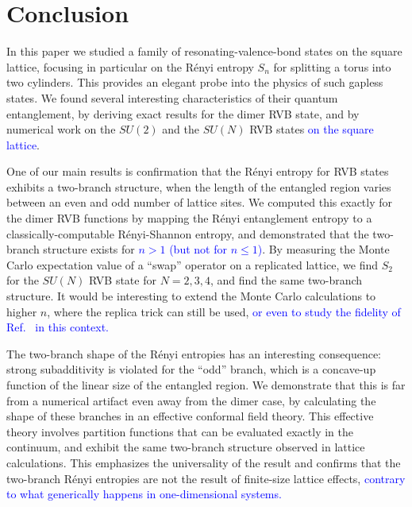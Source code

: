 \documentclass[11pt]{iopart}
\begin{document}
\section{Conclusion} 
\label{sec:conclusion}


In this paper we studied a family of resonating-valence-bond states on the square lattice, focusing in particular on the Rényi entropy $S_n$ for splitting a torus into two cylinders. This provides an elegant probe into the physics of such gapless states. We found several interesting characteristics of their quantum entanglement, by deriving exact results for the dimer RVB state, and by numerical work on the $SU(2)$ and the $SU(N)$ RVB states \textcolor{blue}{on the square lattice}. 

One of our main results is confirmation that the Rényi entropy for RVB states exhibits a two-branch structure, when the length of the entangled region varies between an even and odd number of lattice sites. We computed this exactly for the dimer RVB functions by mapping the R\'enyi entanglement entropy to a classically-computable R\'enyi-Shannon entropy, and demonstrated that the two-branch structure exists for \textcolor{blue}{$n>1$ (but not for $n\leq 1$)}.
By measuring the Monte Carlo expectation value of a ``swap'' operator on a replicated lattice, we find $S_2$ for the $SU(N)$ RVB state for $N=2,3,4$, and find the same two-branch structure. It would be interesting to extend the Monte Carlo calculations to higher $n$, where the replica trick can still be used, \textcolor{blue}{or even to study the fidelity of Ref.~\cite{Bipartite_fidelity} in this context.} 

The two-branch shape of the Rényi entropies has an interesting consequence:  strong subadditivity is violated for the ``odd'' branch, which is a concave-up function of the linear size of the entangled region.  We demonstrate that this is far from a numerical artifact even away from the dimer case, by calculating the shape of these branches in an effective conformal field theory.  This effective theory involves partition functions that can be evaluated exactly in the continuum, and exhibit the same two-branch structure observed in lattice calculations.  This emphasizes the universality of the result and confirms that the two-branch Rényi entropies are not the result of finite-size lattice effects, \textcolor{blue}{contrary to what generically happens in one-dimensional systems\cite{Corrections_scaling1,Corrections_scaling2}.} 
\end{document}
